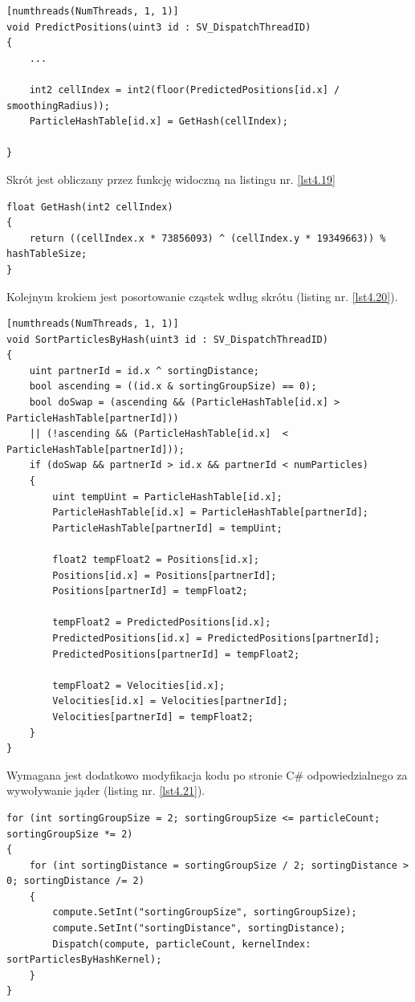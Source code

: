 \documentclass{article}
\begin{document}
\begin{lstlisting}[caption=Zmienione jądro przewidywania pozycji, label={lst4.18}]
[numthreads(NumThreads, 1, 1)]
void PredictPositions(uint3 id : SV_DispatchThreadID)
{
	...
	
	int2 cellIndex = int2(floor(PredictedPositions[id.x] / smoothingRadius));
	ParticleHashTable[id.x] = GetHash(cellIndex);
	
}
\end{lstlisting}
\noindent
Skrót jest obliczany przez funkcję widoczną na listingu nr. \ref{lst4.19}\newline
\begin{lstlisting}[caption=First listing, label={lst4.19}]
float GetHash(int2 cellIndex)
{
	return ((cellIndex.x * 73856093) ^ (cellIndex.y * 19349663)) % hashTableSize;
}
\end{lstlisting}
\noindent
Kolejnym krokiem jest posortowanie cząstek wdług skrótu (listing nr. \ref{lst4.20}).\newline
\begin{lstlisting}[caption=First listing, label={lst4.20}]
    [numthreads(NumThreads, 1, 1)]
void SortParticlesByHash(uint3 id : SV_DispatchThreadID)
{
	uint partnerId = id.x ^ sortingDistance;
	bool ascending = ((id.x & sortingGroupSize) == 0);
	bool doSwap = (ascending && (ParticleHashTable[id.x] > ParticleHashTable[partnerId])) 
    || (!ascending && (ParticleHashTable[id.x]  < ParticleHashTable[partnerId]));
	if (doSwap && partnerId > id.x && partnerId < numParticles)
	{
		uint tempUint = ParticleHashTable[id.x];
		ParticleHashTable[id.x] = ParticleHashTable[partnerId];
        ParticleHashTable[partnerId] = tempUint;
		
        float2 tempFloat2 = Positions[id.x];
        Positions[id.x] = Positions[partnerId];
		Positions[partnerId] = tempFloat2;
		
		tempFloat2 = PredictedPositions[id.x];
        PredictedPositions[id.x] = PredictedPositions[partnerId];
        PredictedPositions[partnerId] = tempFloat2;
		
		tempFloat2 = Velocities[id.x];
		Velocities[id.x] = Velocities[partnerId];
        Velocities[partnerId] = tempFloat2;
    }
}
\end{lstlisting}
\noindent
Wymagana jest dodatkowo modyfikacja kodu po stronie C\# odpowiedzialnego za wywoływanie jąder (listing nr. \ref{lst4.21}).\newline
\begin{lstlisting}[caption=First listing, label={lst4.21}]
for (int sortingGroupSize = 2; sortingGroupSize <= particleCount; sortingGroupSize *= 2)
{
    for (int sortingDistance = sortingGroupSize / 2; sortingDistance > 0; sortingDistance /= 2)
    {
        compute.SetInt("sortingGroupSize", sortingGroupSize);
        compute.SetInt("sortingDistance", sortingDistance);
        Dispatch(compute, particleCount, kernelIndex: sortParticlesByHashKernel);
    }
}
\end{lstlisting}
\end{document}
